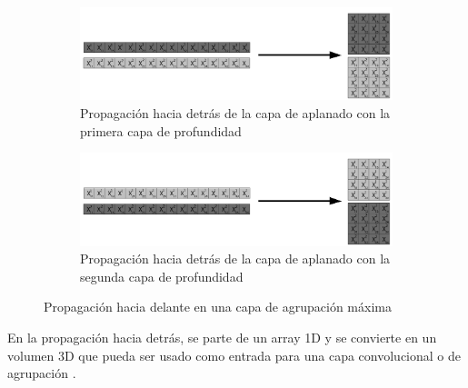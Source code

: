 \begin{figure}[H]
	\centering
	\begin{subfigure}{.5\textwidth}
		\hspace{-30mm}
		\includegraphics[width=2\linewidth]{imagenes/back_flatten_1.jpg}  
		\caption{Propagación hacia detrás de la capa de aplanado con la primera capa de profundidad}
	\end{subfigure}
	\begin{subfigure}{.5\textwidth}
		\hspace{-30mm}
		\includegraphics[width=2\linewidth]{imagenes/back_flatten_2.jpg}  
		\caption{Propagación hacia detrás de la capa de aplanado con la segunda capa de profundidad}
	\end{subfigure}
	
	\caption{Propagación hacia delante en una capa de agrupación máxima}
	\label{fig:back_prop_flatten_canales_profundidad}
\end{figure}

En la propagación hacia detrás, se parte de un array 1D y se convierte en un volumen 3D que pueda ser usado como entrada para una capa convolucional o de agrupación
\cite{flatten_forward}.
